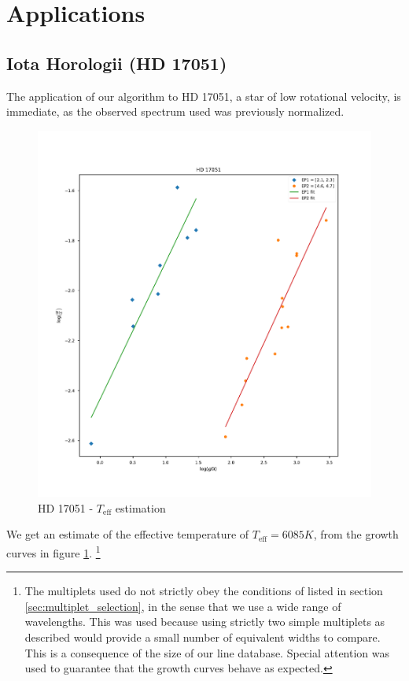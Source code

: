 \documentclass{aa}
\begin{document}
\section{Applications}

\subsection{Iota Horologii (HD 17051)}
\label{sec:star1}

The application of our algorithm to HD 17051, a star of low rotational velocity,
is immediate, as the observed spectrum used was previously normalized.

\begin{figure}[h]
  \centering
  \includegraphics[width=\linewidth]{temperature_estimation_star1.pdf}
  \caption{HD 17051 - $T_\text{eff}$ estimation}
  \label{fig:star1_temp_estimate}
\end{figure}

We get an estimate of the effective temperature of $T_\text{eff} = 6085K$, from
the growth curves in figure \ref{fig:star1_temp_estimate}. \footnote{The
  multiplets used do not strictly obey the conditions of listed in section
  \ref{sec:multiplet_selection}, in the sense that we use a wide range of
  wavelengths. This was used because using strictly two simple multiplets as
  described would provide a small number of equivalent widths to compare.
  This is a consequence of the size of our line database. Special attention was
  used to guarantee that the growth curves behave as expected.}
\end{document}
